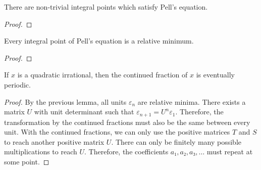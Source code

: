 \begin{lemma}
  There are non-trivial integral points which satisfy Pell's equation.
\end{lemma}

\begin{proof}

\end{proof}

\begin{lemma}
  Every integral point of Pell's equation is a relative minimum.
\end{lemma}

\begin{proof}

\end{proof}

\begin{theorem}
  If $x$ is a quadratic irrational,
  then the continued fraction of $x$ is eventually periodic.
\end{theorem}

\begin{proof}
  By the previous lemma, all units $ε_n$ are relative minima.
  There exists a matrix $U$ with unit determinant such that $ε_{n+1} = U^n ε_1$.
  Therefore, the transformation by the continued fractions must also be the same between every unit.
  With the continued fractions, we can only use the positive matrices $T$ and
  $S$ to reach another positive matrix $U$.
  There can only be finitely many possible multiplications to reach $U$.
  Therefore, the coefficients $a₁, a₂, a₃, …$ must repeat at some point.
\end{proof}
